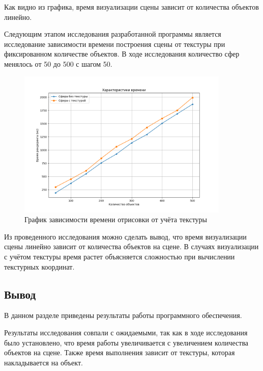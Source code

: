 Как видно из графика, время визуализации сцены зависит от количества объектов линейно.

Следующим этапом исследования разработанной программы является исследование зависимости времени построения сцены от текстуры при фиксированном количестве объектов. В ходе исследования количество сфер менялось от 50 до 500 с шагом 50. 

\begin{figure}[h]
	\centering
	\includegraphics[width=0.9\textwidth]{img/exp/exp2.png}
	\caption{График зависимости времени отрисовки от учёта текстуры}
	\label{fig:exp-2}
\end{figure}
\clearpage
Из проведенного исследования можно сделать вывод, что время визуализации сцены линейно зависит от количества объектов на сцене. В случаях визуализации с учётом текстуры время растет объясняется сложностью при вычислении текстурных координат.

\subsection*{Вывод}
В данном разделе приведены результаты работы программного
обеспечения.

Результаты исследования совпали с ожидаемыми, так как в ходе исследования было установлено, что время работы увеличивается с увеличением количества объектов на сцене. Также время выполнения зависит от текстуры, которая накладывается на объект.
